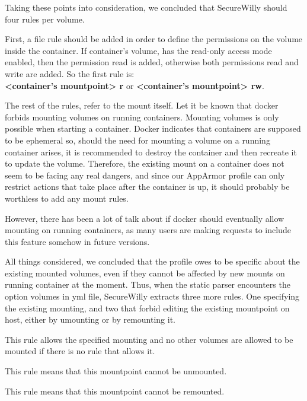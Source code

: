 Taking these points into consideration, we concluded that  SecureWilly should four rules per volume.

First, a file rule should be added in order to define the permissions on the volume inside the container. If container's volume, has the read-only access mode enabled, then the permission read is added, otherwise both permissions read and write are added. So the first rule is: \\\textbf{\textless container's mountpoint\textgreater{} r} or \textbf{\textless container's mountpoint\textgreater{} rw}.

The rest of the rules, refer to the mount itself. Let it be known that docker forbids mounting volumes on running containers. Mounting volumes is only possible when starting a container. Docker indicates that containers are supposed to be ephemeral so, should the need for mounting a volume on a running container arises,  it is recommended to destroy the container and then recreate it to update the volume. Therefore, the existing mount on a container does not seem to be facing any real dangers, and since our AppArmor profile can only restrict actions that take place after the container is up, it should probably be worthless to add any mount rules.

However,  there has been a lot of talk about if docker should eventually allow mounting on running containers, as many users are making requests to include this feature somehow in future versions.

All things considered, we concluded that the profile owes to be specific about the existing mounted volumes, even if they cannot be affected by new mounts on running container at the moment. Thus, when the static parser encounters the option volumes in yml file, SecureWilly extracts three more rules. One specifying the existing mounting, and two that forbid editing the existing mountpoint on host, either by umounting or by remounting it.
\begin{description}[style=nextline]
\item[mount \textless source host path\textgreater{} -\textgreater{} \textless container's mountpoint\textgreater{}]
This rule allows the specified mounting and no other volumes are allowed to be mounted if there is no rule that allows it.

\item[deny umount \textless container's mountpoint\textgreater{}]
This rule means that this mountpoint cannot be unmounted.

\item[deny remount \textless container's mountpoint\textgreater{}]
This rule means that this mountpoint cannot be remounted.
\end{description}

